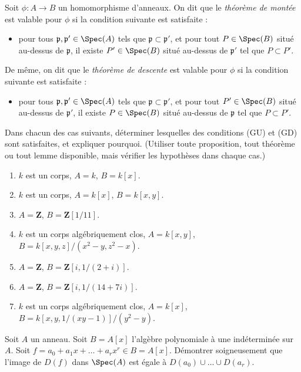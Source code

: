 \begin{definition}
\label{definition-GU-GD}
Soit $\phi : A \to B$ un homomorphisme d'anneaux. On dit
que le {\it théorème de montée} est valable pour $\phi$ si la
condition suivante est satisfaite :
\begin{itemize}
\item[(GU)] pour tous ${\mathfrak p}, {\mathfrak p}' \in \Spec(A)$ tels que
${\mathfrak p} \subset {\mathfrak p}'$, et pour tout $P \in \Spec(B)$ situé
au-dessus de ${\mathfrak p}$, il existe $P'\in \Spec(B)$ situé
au-dessus de ${\mathfrak p}'$ tel que $P \subset P'$.
\end{itemize}
De même, on dit que le {\it théorème de descente} est valable pour $\phi$
si la condition suivante est satisfaite :
\begin{itemize}
\item[(GD)] pour tous ${\mathfrak p}, {\mathfrak p}' \in \Spec(A)$ tels que
${\mathfrak p} \subset {\mathfrak p}'$, et pour tout
$P' \in \Spec(B)$ situé
au-dessus de ${\mathfrak p}'$, il existe $P\in \Spec(B)$ situé
au-dessus de ${\mathfrak p}$ tel que $P \subset P'$.
\end{itemize}
\end{definition}

\begin{exercise}
\label{exercise-GU-GD}
Dans chacun des cas suivants, déterminer lesquelles des conditions
(GU) et (GD) sont satisfaites, et expliquer pourquoi. (Utiliser toute proposition,
tout théorème ou tout lemme disponible, mais vérifier les hypothèses dans chaque cas.)
\begin{enumerate}
\item $k$ est un corps, $A = k$, $B = k[x]$.
\item $k$ est un corps, $A = k[x]$, $B = k[x, y]$.
\item $A = {\mathbf Z}$, $B = {\mathbf Z}[1/11]$.
\item $k$ est un corps algébriquement clos, $A = k[x, y]$,
$B = k[x, y, z]/(x^2-y, z^2-x)$.
\item $A = {\mathbf Z}$, $B = {\mathbf Z}[i, 1/(2 + i)]$.
\item $A = {\mathbf Z}$, $B = {\mathbf Z}[i, 1/(14 + 7i)]$.
\item $k$ est un corps algébriquement clos, $A = k[x]$,
$B = k[x, y, 1/(xy-1)]/(y^2-y)$.
\end{enumerate}
\end{exercise}

\begin{exercise}
\label{exercise-image}
Soit $A$ un anneau. Soit $B = A[x]$ l'algèbre polynomiale à
une indéterminée sur $A$. Soit $f = a_0 + a_1 x + \ldots + a_r x^r \in B = A[x]$.
Démontrer soigneusement que l'image de $D(f)$ dans $\Spec(A)$ est égale à
$D(a_0) \cup \ldots \cup D(a_r)$.
\end{exercise}

